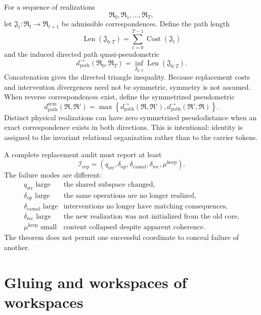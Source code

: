 For a sequence of realizations
\[
\mathfrak R_0,\mathfrak R_1,\ldots,\mathfrak R_T,
\]
let \(\mathfrak J_t:\mathfrak R_t\to\mathfrak R_{t+1}\) be admissible
correspondences. Define the path length
\[
\operatorname{Len}(\mathfrak J_{0:T})
=
\sum_{t=0}^{T-1}\operatorname{Cost}(\mathfrak J_t)
\]
and the induced directed path quasi-pseudometric
\[
\boxed{
d_{\mathrm{path}}^{\rightarrow}(\mathfrak R_0,\mathfrak R_T)
=
\inf_{\mathfrak J_{0:T}}
\operatorname{Len}(\mathfrak J_{0:T}).
}
\]
Concatenation gives the directed triangle inequality. Because replacement
costs and intervention divergences need not be symmetric, symmetry is not
assumed. When reverse correspondences exist, define the symmetrized
pseudometric
\[
\boxed{
d_{\mathrm{path}}^{\mathrm{sym}}(\mathfrak R,\mathfrak R')
=
\max\left\{
 d_{\mathrm{path}}^{\rightarrow}(\mathfrak R,\mathfrak R'),
 d_{\mathrm{path}}^{\rightarrow}(\mathfrak R',\mathfrak R)
\right\}.
}
\]
Distinct physical realizations can have zero symmetrized pseudodistance when
an exact correspondence exists in both directions. This is intentional:
identity is assigned to the invariant relational organization rather than to
the carrier tokens.


A complete replacement audit must report at least
\[
\boxed{
\mathcal I_{\mathrm{rep}}
=
\left(
q_{\mathrm{str}},
\delta_{\mathrm{op}},
\delta_{\mathrm{causal}},
\delta_{\mathrm{rec}},
\mu^{\mathrm{keep}}
\right).
}
\]
The failure modes are different:
\[
\begin{array}{ll}
q_{\mathrm{str}}\text{ large}
&\text{the shared subspace changed},\\
\delta_{\mathrm{op}}\text{ large}
&\text{the same operations are no longer realized},\\
\delta_{\mathrm{causal}}\text{ large}
&\text{interventions no longer have matching consequences},\\
\delta_{\mathrm{rec}}\text{ large}
&\text{the new realization was not initialized from the old core},\\
\mu^{\mathrm{keep}}\text{ small}
&\text{content collapsed despite apparent coherence}.
\end{array}
\]
The theorem does not permit one successful coordinate to conceal failure of
another.


\chapter{Gluing and workspaces of workspaces}\label{SRWT:book:chapter-79}


